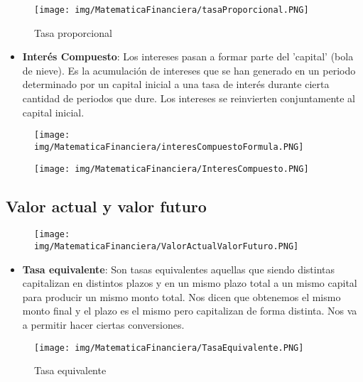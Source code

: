 \documentclass[titlepage,a4paper]{article}
\begin{document}
\begin{figure}[!htb]
    \centering
    \texttt{[image: img/MatematicaFinanciera/tasaProporcional.PNG]}
    \caption{Tasa proporcional}
\end{figure}


\begin{itemize}
\item \textbf{Interés Compuesto}: Los intereses pasan a formar parte del 'capital' (bola de nieve). Es la acumulación de intereses que se han generado en un periodo determinado por un capital inicial a una tasa de interés durante cierta cantidad de periodos que dure. Los intereses se reinvierten conjuntamente al capital inicial.
\end{itemize}

\begin{figure}[!htb]
    \centering
    \texttt{[image: img/MatematicaFinanciera/interesCompuestoFormula.PNG]}
\end{figure}

\begin{figure}[!htb]
    \centering
    \texttt{[image: img/MatematicaFinanciera/InteresCompuesto.PNG]}
\end{figure}


\newpage
\subsection{Valor actual y valor futuro}

\begin{figure}[!htb]
    \centering
    \texttt{[image: img/MatematicaFinanciera/ValorActualValorFuturo.PNG]}
\end{figure}


\begin{itemize}
\item \textbf{Tasa equivalente}: Son tasas equivalentes aquellas que siendo distintas capitalizan en distintos plazos y en un mismo plazo total a un mismo capital para producir un mismo monto total. Nos dicen que obtenemos el mismo monto final y el plazo es el mismo pero capitalizan de forma distinta. Nos va a permitir hacer ciertas conversiones.
\end{itemize}

\begin{figure}[!htb]
    \centering
    \texttt{[image: img/MatematicaFinanciera/TasaEquivalente.PNG]}
    \caption{Tasa equivalente}
\end{figure}
\end{document}
